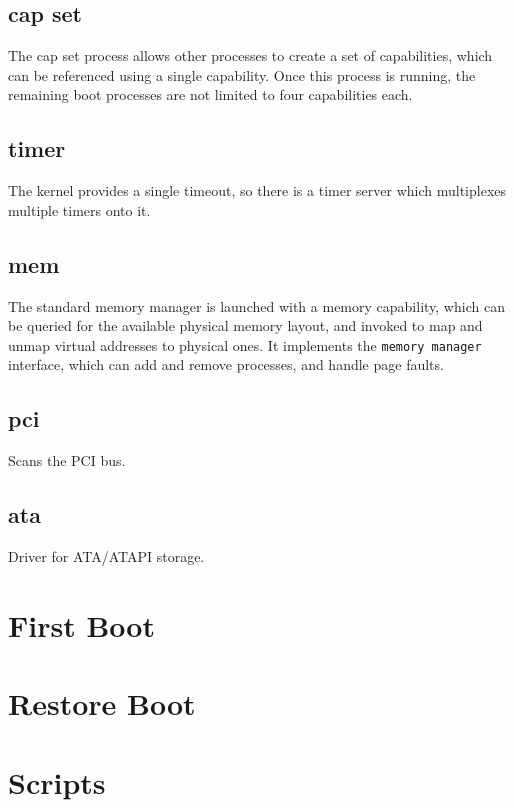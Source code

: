 \subsection{cap set}

The cap set process allows other processes to create a set of capabilities, which can be referenced using a single capability.  Once this process is running, the remaining boot processes are not limited to four capabilities each.

\subsection{timer}

The kernel provides a single timeout, so there is a timer server which multiplexes multiple timers onto it.

\subsection{mem}

The standard memory manager is launched with a memory capability, which can be queried for the available physical memory layout, and invoked to map and unmap virtual addresses to physical ones.  It implements the {\tt memory manager} interface, which can add and remove processes, and handle page faults.

\subsection{pci}

Scans the PCI bus.

\subsection{ata}

Driver for ATA/ATAPI storage.

\section{First Boot}

\section{Restore Boot}

\section{Scripts}

